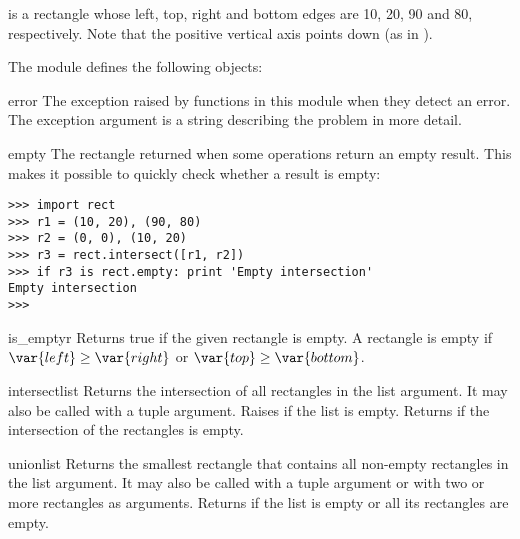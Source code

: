 is a rectangle whose left, top, right and bottom edges are 10, 20, 90
and 80, respectively.  Note that the positive vertical axis points
down (as in ).

The module defines the following objects:

\begin{excdesc}{error}
The exception raised by functions in this module when they detect an
error.  The exception argument is a string describing the problem in
more detail.
\end{excdesc}

\begin{datadesc}{empty}
The rectangle returned when some operations return an empty result.
This makes it possible to quickly check whether a result is empty:

\begin{verbatim}
>>> import rect
>>> r1 = (10, 20), (90, 80)
>>> r2 = (0, 0), (10, 20)
>>> r3 = rect.intersect([r1, r2])
>>> if r3 is rect.empty: print 'Empty intersection'
Empty intersection
>>> 
\end{verbatim}
\end{datadesc}

\begin{funcdesc}{is_empty}{r}
Returns true if the given rectangle is empty.
A rectangle
is empty if
\begin{math}\var{left} \geq \var{right}\end{math} or
\begin{math}\var{top} \geq \var{bottom}\end{math}.
\end{funcdesc}

\begin{funcdesc}{intersect}{list}
Returns the intersection of all rectangles in the list argument.
It may also be called with a tuple argument.  Raises
 if the list is empty.  Returns
 if the intersection of the rectangles is empty.
\end{funcdesc}

\begin{funcdesc}{union}{list}
Returns the smallest rectangle that contains all non-empty rectangles in
the list argument.  It may also be called with a tuple argument or
with two or more rectangles as arguments.  Returns
 if the list is empty or all its rectangles are
empty.
\end{funcdesc}

